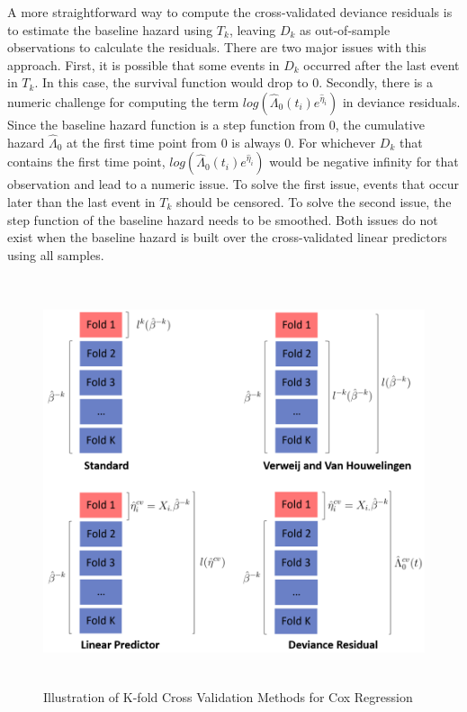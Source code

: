 A more straightforward way to compute the cross-validated deviance residuals is to estimate the baseline hazard using $T_k$, leaving $D_k$ as out-of-sample observations to calculate the residuals. There are two major issues with this approach. First, it is possible that some events in $D_k$ occurred after the last event in $T_k$. In this case, the survival function would drop to 0. Secondly, there is a numeric challenge for computing the term $log(\hat{\Lambda}_{0}(t_{i})e^{\hat{\eta}_{i}})$ in deviance residuals. Since the baseline hazard function is a step function from 0, the cumulative hazard $\hat{\Lambda}_{0}$ at the first time point from 0 is always 0. For whichever $D_k$ that contains the first time point, $log(\hat{\Lambda}_{0}(t_{i})e^{\hat{\eta}_{i}})$ would be negative infinity for that observation and lead to a numeric issue. To solve the first issue, events that occur later than the last event in $T_k$ should be censored. To solve the second issue, the step function of the baseline hazard needs to be smoothed. Both issues do not exist when the baseline hazard is built over the cross-validated linear predictors using all samples. 

\begin{figure}
  \centering
		\includegraphics[height= 12cm ]{./figures/figure_1_new.png}
   \caption{Illustration of K-fold Cross Validation Methods for Cox Regression}
\end{figure}	

